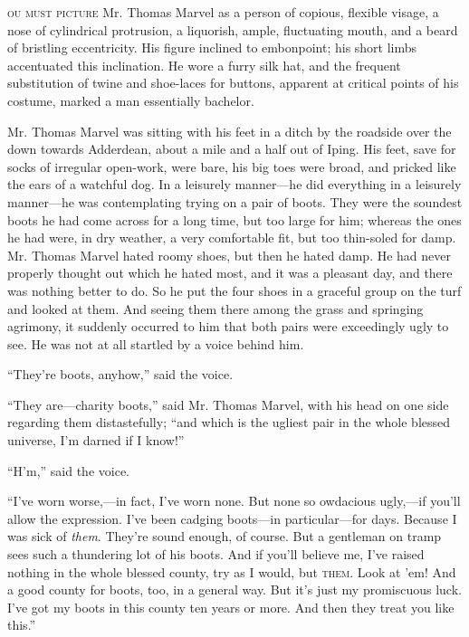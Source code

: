 \label{ch:09}
\begin{ChapterStart}
\vspace*{2\nbs}

\vspace{1.5\nbs}
\end{ChapterStart}

\kern-4pt\textsc{ou must picture} Mr. Thomas Marvel as a person of copious, flexible visage, a nose of cylindrical protrusion, a liquorish, ample, fluctuating mouth, and a beard of bristling eccentricity. His figure inclined to embonpoint; his short limbs accentuated this inclination. He wore a furry silk hat, and the frequent substitution of twine and shoe-laces for buttons, apparent at critical points of his costume, marked a man essentially bachelor.

Mr. Thomas Marvel was sitting with his feet in a ditch by the roadside over the down towards Adderdean, about a mile and a half out of Iping. His feet, save for socks of irregular open-work, were bare, his big toes were broad, and pricked like the ears of a watchful dog. In a leisurely manner—he did everything in a leisurely manner—he was contemplating trying on a pair of boots. They were the soundest boots he had come across for a long time, but too large for him; whereas the ones he had were, in dry weather, a very comfortable fit, but too thin-soled for damp. Mr. Thomas Marvel hated roomy shoes, but then he hated damp. He had never properly thought out which he hated most, and it was a pleasant day, and there was nothing better to do. So he put the four shoes in a graceful group on the turf and looked at them. And seeing them there among the grass and springing agrimony, it suddenly occurred to him that both pairs were exceedingly ugly to see. He was not at all startled by a voice behind him.

“They’re boots, anyhow,” said the voice.

“They are—charity boots,” said Mr. Thomas Marvel, with his head on one side regarding them distastefully; “and which is the ugliest pair in the whole blessed universe, I’m darned if I know!”

“H’m,” said the voice.

“I’ve worn worse,—in fact, I’ve worn none. But none so owdacious ugly,—if you’ll allow the expression. I’ve been cadging boots—in particular—for days. Because I was sick of \emph{them}. They’re sound enough, of course. But a gentleman on tramp sees such a thundering lot of his boots. And if you’ll believe me, I’ve raised nothing in the whole blessed county, try as I would, but \textsc{them}. Look at ’em! And a good county for boots, too, in a general way. But it’s just my promiscuous luck. I’ve got my boots in this county ten years or more. And then they treat you like this.”

